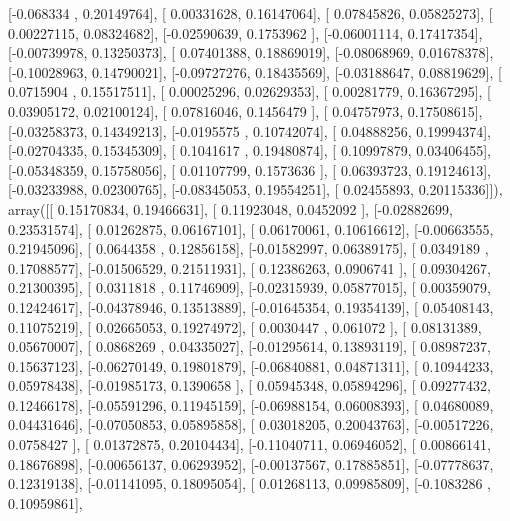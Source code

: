 \documentclass{article}
\begin{document}
       [-0.068334  ,  0.20149764],
       [ 0.00331628,  0.16147064],
       [ 0.07845826,  0.05825273],
       [ 0.00227115,  0.08324682],
       [-0.02590639,  0.1753962 ],
       [-0.06001114,  0.17417354],
       [-0.00739978,  0.13250373],
       [ 0.07401388,  0.18869019],
       [-0.08068969,  0.01678378],
       [-0.10028963,  0.14790021],
       [-0.09727276,  0.18435569],
       [-0.03188647,  0.08819629],
       [ 0.0715904 ,  0.15517511],
       [ 0.00025296,  0.02629353],
       [ 0.00281779,  0.16367295],
       [ 0.03905172,  0.02100124],
       [ 0.07816046,  0.1456479 ],
       [ 0.04757973,  0.17508615],
       [-0.03258373,  0.14349213],
       [-0.0195575 ,  0.10742074],
       [ 0.04888256,  0.19994374],
       [-0.02704335,  0.15345309],
       [ 0.1041617 ,  0.19480874],
       [ 0.10997879,  0.03406455],
       [-0.05348359,  0.15758056],
       [ 0.01107799,  0.1573636 ],
       [ 0.06393723,  0.19124613],
       [-0.03233988,  0.02300765],
       [-0.08345053,  0.19554251],
       [ 0.02455893,  0.20115336]]), array([[ 0.15170834,  0.19466631],
       [ 0.11923048,  0.0452092 ],
       [-0.02882699,  0.23531574],
       [ 0.01262875,  0.06167101],
       [ 0.06170061,  0.10616612],
       [-0.00663555,  0.21945096],
       [ 0.0644358 ,  0.12856158],
       [-0.01582997,  0.06389175],
       [ 0.0349189 ,  0.17088577],
       [-0.01506529,  0.21511931],
       [ 0.12386263,  0.0906741 ],
       [ 0.09304267,  0.21300395],
       [ 0.0311818 ,  0.11746909],
       [-0.02315939,  0.05877015],
       [ 0.00359079,  0.12424617],
       [-0.04378946,  0.13513889],
       [-0.01645354,  0.19354139],
       [ 0.05408143,  0.11075219],
       [ 0.02665053,  0.19274972],
       [ 0.0030447 ,  0.061072  ],
       [ 0.08131389,  0.05670007],
       [ 0.0868269 ,  0.04335027],
       [-0.01295614,  0.13893119],
       [ 0.08987237,  0.15637123],
       [-0.06270149,  0.19801879],
       [-0.06840881,  0.04871311],
       [ 0.10944233,  0.05978438],
       [-0.01985173,  0.1390658 ],
       [ 0.05945348,  0.05894296],
       [ 0.09277432,  0.12466178],
       [-0.05591296,  0.11945159],
       [-0.06988154,  0.06008393],
       [ 0.04680089,  0.04431646],
       [-0.07050853,  0.05895858],
       [ 0.03018205,  0.20043763],
       [-0.00517226,  0.0758427 ],
       [ 0.01372875,  0.20104434],
       [-0.11040711,  0.06946052],
       [ 0.00866141,  0.18676898],
       [-0.00656137,  0.06293952],
       [-0.00137567,  0.17885851],
       [-0.07778637,  0.12319138],
       [-0.01141095,  0.18095054],
       [ 0.01268113,  0.09985809],
       [-0.1083286 ,  0.10959861],
\end{document}
